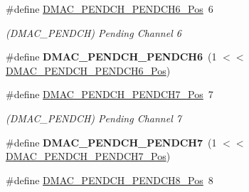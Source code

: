 \begin{DoxyCompactItemize}
\item 
\hypertarget{group___s_a_m_l21___d_m_a_c_gac3de4830918d0bf57e86c410ca90196c}{}\#define \hyperlink{group___s_a_m_l21___d_m_a_c_gac3de4830918d0bf57e86c410ca90196c}{D\+M\+A\+C\+\_\+\+P\+E\+N\+D\+C\+H\+\_\+\+P\+E\+N\+D\+C\+H6\+\_\+\+Pos}~6\label{group___s_a_m_l21___d_m_a_c_gac3de4830918d0bf57e86c410ca90196c}

\begin{DoxyCompactList}\small\item\em (D\+M\+A\+C\+\_\+\+P\+E\+N\+D\+C\+H) Pending Channel 6 \end{DoxyCompactList}\item 
\hypertarget{group___s_a_m_l21___d_m_a_c_gab7fe6bc7d0a87a3ab75500a098118310}{}\#define {\bfseries D\+M\+A\+C\+\_\+\+P\+E\+N\+D\+C\+H\+\_\+\+P\+E\+N\+D\+C\+H6}~(1 $<$$<$ \hyperlink{group___s_a_m_l21___d_m_a_c_gac3de4830918d0bf57e86c410ca90196c}{D\+M\+A\+C\+\_\+\+P\+E\+N\+D\+C\+H\+\_\+\+P\+E\+N\+D\+C\+H6\+\_\+\+Pos})\label{group___s_a_m_l21___d_m_a_c_gab7fe6bc7d0a87a3ab75500a098118310}

\item 
\hypertarget{group___s_a_m_l21___d_m_a_c_ga4e2438bf80fb8dc8d57ed90da53723a5}{}\#define \hyperlink{group___s_a_m_l21___d_m_a_c_ga4e2438bf80fb8dc8d57ed90da53723a5}{D\+M\+A\+C\+\_\+\+P\+E\+N\+D\+C\+H\+\_\+\+P\+E\+N\+D\+C\+H7\+\_\+\+Pos}~7\label{group___s_a_m_l21___d_m_a_c_ga4e2438bf80fb8dc8d57ed90da53723a5}

\begin{DoxyCompactList}\small\item\em (D\+M\+A\+C\+\_\+\+P\+E\+N\+D\+C\+H) Pending Channel 7 \end{DoxyCompactList}\item 
\hypertarget{group___s_a_m_l21___d_m_a_c_ga111f396ea3ea6f83c34cf3a720c0d5d8}{}\#define {\bfseries D\+M\+A\+C\+\_\+\+P\+E\+N\+D\+C\+H\+\_\+\+P\+E\+N\+D\+C\+H7}~(1 $<$$<$ \hyperlink{group___s_a_m_l21___d_m_a_c_ga4e2438bf80fb8dc8d57ed90da53723a5}{D\+M\+A\+C\+\_\+\+P\+E\+N\+D\+C\+H\+\_\+\+P\+E\+N\+D\+C\+H7\+\_\+\+Pos})\label{group___s_a_m_l21___d_m_a_c_ga111f396ea3ea6f83c34cf3a720c0d5d8}

\item 
\hypertarget{group___s_a_m_l21___d_m_a_c_ga907776d2406a117c2e64b3520493d30c}{}\#define \hyperlink{group___s_a_m_l21___d_m_a_c_ga907776d2406a117c2e64b3520493d30c}{D\+M\+A\+C\+\_\+\+P\+E\+N\+D\+C\+H\+\_\+\+P\+E\+N\+D\+C\+H8\+\_\+\+Pos}~8\label{group___s_a_m_l21___d_m_a_c_ga907776d2406a117c2e64b3520493d30c}


\end{DoxyCompactItemize}
